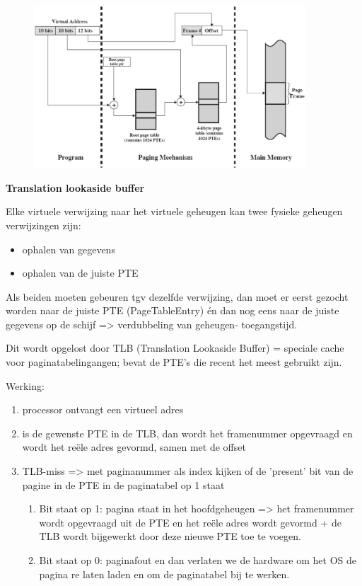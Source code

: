 \begin{figure}[htp]
    \centering
            \includegraphics[width=4in]{img/Geinventeerdepaginatabel.jpg}
        \caption{}
    \label{fig:}
\end{figure}

\textbf{Translation lookaside buffer}

Elke virtuele verwijzing naar het virtuele geheugen kan twee fysieke geheugen verwijzingen zijn:

\begin{itemize}
\item ophalen van gegevens
\item ophalen van de juiste PTE
\end{itemize}

Als beiden moeten gebeuren tgv dezelfde verwijzing, dan moet er eerst gezocht worden naar de juiste PTE (PageTableEntry) én dan nog eens naar de juiste gegevens op de schijf => verdubbeling van geheugen- toegangstijd.

Dit wordt opgelost door TLB (Translation Lookaside Buffer) = speciale cache voor paginatabelingangen; bevat de PTE's die recent het meest gebruikt zijn.

Werking:

\begin{enumerate}
    \item processor ontvangt een virtueel adres
    \item is de gewenste PTE in de TLB, dan wordt het framenummer opgevraagd en wordt het reële adres gevormd, samen met de offset
    \item TLB-miss => met paginanummer als index kijken of de 'present' bit van de pagine in de PTE in de paginatabel op 1 staat
        \begin{enumerate}
        \item Bit staat op 1: pagina staat in het hoofdgeheugen => het framenummer wordt opgevraagd uit de PTE en het reële adres wordt gevormd + de TLB wordt bijgewerkt door deze nieuwe PTE toe te voegen.
        \item Bit staat op 0: paginafout en dan verlaten we de hardware om het OS de pagina re laten laden en om de paginatabel bij te werken.
        \end{enumerate}
\end{enumerate}

